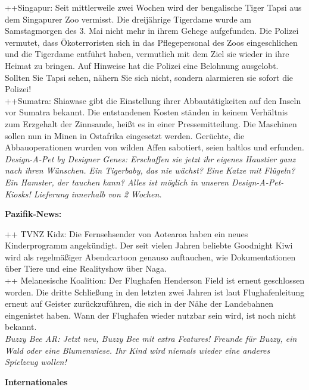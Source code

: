 \documentclass[final]{multiversum}
\begin{document}
++Singapur: Seit mittlerweile zwei Wochen wird der bengalische Tiger Tapsi aus
dem Singapurer Zoo vermisst. Die dreijährige Tigerdame wurde am Samstagmorgen
des 3. Mai nicht mehr in ihrem Gehege aufgefunden. Die Polizei vermutet, dass
Ökoterroristen sich in das Pflegepersonal des Zoos eingeschlichen und die
Tigerdame entführt haben, vermutlich mit dem Ziel sie wieder in ihre Heimat zu
bringen. Auf Hinweise hat die Polizei eine Belohnung ausgelobt. Sollten Sie
Tapsi sehen, nähern Sie sich nicht, sondern alarmieren sie sofort die Polizei!\\
\indent ++Sumatra: Shiawase gibt die Einstellung ihrer Abbautätigkeiten auf den
Inseln vor Sumatra bekannt. Die entstandenen Kosten ständen in keinem Verhältnis
zum Erzgehalt der Zinnsande, heißt es in einer Pressemitteilung. Die Maschinen
sollen nun in Minen in Ostafrika eingesetzt werden. Gerüchte, die
Abbauoperationen wurden von wilden Affen sabotiert, seien haltlos und
erfunden.\\
\indent \textit{Design-A-Pet by Designer Genes: Erschaffen sie jetzt ihr eigenes
Haustier ganz nach ihren Wünschen. Ein Tigerbaby, das nie wächst? Eine Katze mit
Flügeln? Ein Hamster, der tauchen kann? Alles ist möglich in unseren
Design-A-Pet-Kiosks! Lieferung innerhalb von 2 Wochen.}

\textbf{Pazifik-News:}

++ TVNZ Kidz: Die Fernsehsender von Aotearoa haben ein neues Kinderprogramm
angekündigt. Der seit vielen Jahren beliebte Goodnight Kiwi wird als
regelmäßiger Abendcartoon genauso auftauchen, wie Dokumentationen über Tiere und
eine Realityshow über Naga.\\
\indent ++ Melanesische Koalition: Der Flughafen Henderson Field ist erneut
geschlossen worden. Die dritte Schließung in den letzten zwei Jahren ist laut
Flughafenleitung erneut auf Geister zurückzuführen, die sich in der Nähe der
Landebahnen eingenistet haben. Wann der Flughafen wieder nutzbar sein wird, ist
noch nicht bekannt.\\
\indent \textit{Buzzy Bee AR: Jetzt neu, Buzzy Bee mit extra Features! Freunde für
Buzzy, ein Wald oder eine Blumenwiese. Ihr Kind wird niemals wieder eine anderes
Spielzeug wollen!}

\textbf{Internationales}
\end{document}
